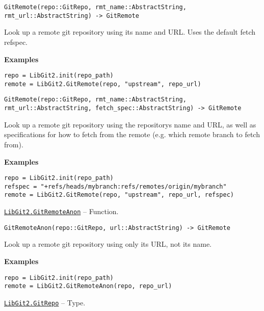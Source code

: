 \begin{adjustwidth}{2em}{0pt}


\begin{verbatim}
GitRemote(repo::GitRepo, rmt_name::AbstractString, rmt_url::AbstractString) -> GitRemote
\end{verbatim}

Look up a remote git repository using its name and URL. Uses the default fetch refspec.

\textbf{Examples}


\begin{verbatim}
repo = LibGit2.init(repo_path)
remote = LibGit2.GitRemote(repo, "upstream", repo_url)
\end{verbatim}




\begin{lstlisting}
GitRemote(repo::GitRepo, rmt_name::AbstractString, rmt_url::AbstractString, fetch_spec::AbstractString) -> GitRemote
\end{lstlisting}

Look up a remote git repository using the repository{\textquotesingle}s name and URL, as well as specifications for how to fetch from the remote (e.g. which remote branch to fetch from).

\textbf{Examples}


\begin{verbatim}
repo = LibGit2.init(repo_path)
refspec = "+refs/heads/mybranch:refs/remotes/origin/mybranch"
remote = LibGit2.GitRemote(repo, "upstream", repo_url, refspec)
\end{verbatim}



\end{adjustwidth}
\hypertarget{13915605113589562056}{}
\hyperlink{13915605113589562056}{\texttt{LibGit2.GitRemoteAnon}}  -- {Function.}

\begin{adjustwidth}{2em}{0pt}


\begin{verbatim}
GitRemoteAnon(repo::GitRepo, url::AbstractString) -> GitRemote
\end{verbatim}

Look up a remote git repository using only its URL, not its name.

\textbf{Examples}


\begin{verbatim}
repo = LibGit2.init(repo_path)
remote = LibGit2.GitRemoteAnon(repo, repo_url)
\end{verbatim}



\end{adjustwidth}
\hypertarget{3263346103236484748}{}
\hyperlink{3263346103236484748}{\texttt{LibGit2.GitRepo}}  -- {Type.}

